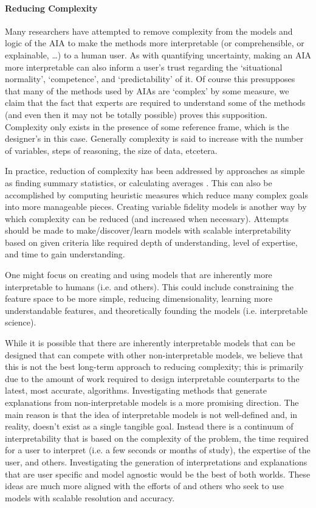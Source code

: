     \paragraph{Reducing Complexity} Many researchers have attempted to remove complexity from the models and logic of the AIA to make the methods more interpretable (or comprehensible, or explainable, \ldots) to a human user. As with quantifying uncertainty, making an AIA more interpretable can also inform a user's trust regarding the `situational normality', `competence', and `predictability' of it. Of course this presupposes that many of the methods used by AIAs are `complex' by some measure, we claim that the fact that experts are required to understand some of the methods (and even then it may not be totally possible) proves this supposition. Complexity only exists in the presence of some reference frame, which is the designer's in this case. Generally complexity is said to increase with the number of variables, steps of reasoning, the size of data, etcetera.

    In practice, reduction of complexity has been addressed by approaches as simple as finding summary statistics, or calculating averages \cite{Muir1994-ow,Muir1996-gt}. This can also be accomplished by computing heuristic measures which reduce many complex goals into more manageable pieces\cite{Aitken2016-fb}. Creating variable fidelity models is another way by which complexity can be reduced (and increased when necessary). Attempts should be made to make/discover/learn models with scalable interpretability based on given criteria like required depth of understanding, level of expertise, and time to gain understanding.
    
    One might focus on creating and using models that are inherently more interpretable to humans (i.e. \cite{Caruana2015-za} and others). This could include constraining the feature space to be more simple, reducing dimensionality, learning more understandable features, and theoretically founding the models (i.e. interpretable science).
    
    While it is possible that there are inherently interpretable models that can be designed that can compete with other non-interpretable models, we believe that this is not the best long-term approach to reducing complexity; this is primarily due to the amount of work required to design interpretable counterparts to the latest, most accurate, algorithms. Investigating methods that generate explanations from non-interpretable models is a more promising direction. The main reason is that the idea of interpretable models is not well-defined and, in reality, doesn't exist as a single tangible goal. Instead there is a continuum of interpretability that is based on the complexity of the problem, the time required for a user to interpret (i.e. a few seconds or months of study), the expertise of the user, and others. Investigating the generation of interpretations and explanations that are user specific and model agnostic would be the best of both worlds. These ideas are much more aligned with the efforts of \cite{Ruping2006-xj} and others who seek to use models with scalable resolution and accuracy.

